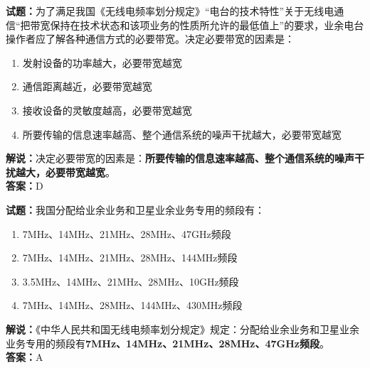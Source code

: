 \documentclass{ctexbook}
\begin{document}
\vspace{\baselineskip}

\noindent\textbf{试题：}为了满足我国《无线电频率划分规定》“电台的技术特性”关于无线电通信“把带宽保持在技术状态和该项业务的性质所允许的最低值上”的要求，业余电台操作者应了解各种通信方式的必要带宽。决定必要带宽的因素是：
\begin{enumerate}[leftmargin=3em]
  \item 发射设备的功率越大，必要带宽越宽
  \item 通信距离越近，必要带宽越宽
  \item 接收设备的灵敏度越高，必要带宽越宽
  \item 所要传输的信息速率越高、整个通信系统的噪声干扰越大，必要带宽越宽
\end{enumerate}
\noindent\textbf{解说：}决定必要带宽的因素是：\textbf{所要传输的信息速率越高、整个通信系统的噪声干扰越大，必要带宽越宽}。\\\noindent\textbf{答案：}D

\vspace{\baselineskip}

\noindent\textbf{试题：}我国分配给业余业务和卫星业余业务专用的频段有：
\begin{enumerate}[leftmargin=3em]
  \item 7\unit{\MHz}、14\unit{\MHz}、21\unit{\MHz}、28\unit{\MHz}、47\unit{\GHz}频段
  \item 7\unit{\MHz}、14\unit{\MHz}、21\unit{\MHz}、28\unit{\MHz}、144\unit{\MHz}频段
  \item 3.5\unit{\MHz}、14\unit{\MHz}、21\unit{\MHz}、28\unit{\MHz}、10\unit{\GHz}频段
  \item 7\unit{\MHz}、14\unit{\MHz}、28\unit{\MHz}、144\unit{\MHz}、430\unit{\MHz}频段
\end{enumerate}
\noindent\textbf{解说：}《中华人民共和国无线电频率划分规定》规定：分配给业余业务和卫星业余业务专用的频段有\textbf{7\unit{\MHz}、14\unit{\MHz}、21\unit{\MHz}、28\unit{\MHz}、47\unit{\GHz}频段}。\\\noindent\textbf{答案：}A
\vspace{\baselineskip}
\end{document}
